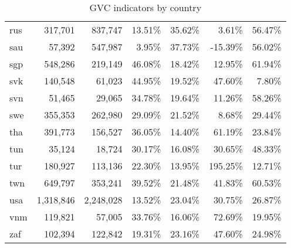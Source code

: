 \documentclass[11pt,a4paper]{article}
\begin{document}
\begin{table}[h]
\begin{tabular}{lrrrrrr}
    rus   & 317,701 & 837,747 & 13.51\% & 35.62\% & 3.61\% & 56.47\% \\
    sau   & 57,392 & 547,987 & 3.95\% & 37.73\% & -15.39\% & 56.02\% \\
    sgp   & 548,286 & 219,149 & 46.08\% & 18.42\% & 12.95\% & 61.94\% \\
    svk   & 140,548 & 61,023 & 44.95\% & 19.52\% & 47.60\% & 7.80\% \\
    svn   & 51,465 & 29,065 & 34.78\% & 19.64\% & 11.26\% & 58.26\% \\
    swe   & 355,353 & 262,980 & 29.09\% & 21.52\% & 8.68\% & 29.44\% \\
    tha   & 391,773 & 156,527 & 36.05\% & 14.40\% & 61.19\% & 23.84\% \\
    tun   & 35,124 & 18,724 & 30.17\% & 16.08\% & 30.65\% & 48.33\% \\
    tur   & 180,927 & 113,136 & 22.30\% & 13.95\% & 195.25\% & 12.71\% \\
    twn   & 649,797 & 353,241 & 39.52\% & 21.48\% & 41.83\% & 60.53\% \\
    usa   & 1,318,846 & 2,248,028 & 13.52\% & 23.04\% & 30.75\% & 26.87\% \\
    vnm   & 119,821 & 57,005 & 33.76\% & 16.06\% & 72.69\% & 19.95\% \\
    zaf   & 102,394 & 122,842 & 19.31\% & 23.16\% & 47.60\% & 24.98\% \\
    \bottomrule
    \end{tabular}
      \caption{GVC indicators by country}
  \label{tab:gvc_k}
\end{table}
\end{document}
